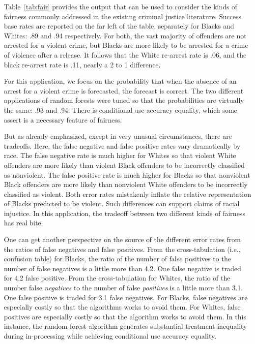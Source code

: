 \documentclass[12pt]{article}
\begin{document}
Table~\ref{tab:fair} provides the output that can be used to consider the kinds of fairness commonly addressed in the existing criminal justice literature. Success base rates are reported on the far left of the table, separately for Blacks and Whites: .89 and .94 respectively. For both, the vast majority of offenders are not arrested for a violent crime, but Blacks are more likely to be arrested for a crime of violence after a release. It follows that the White re-arrest rate is .06, and the black re-arrest rate is .11, nearly a 2 to 1 difference. 

For this application, we focus on the probability that when the absence of an arrest for a violent crime is forecasted, the forecast is correct. The two different applications of random forests were tuned so that the probabilities are virtually the same: .93 and .94. There is conditional use accuracy equality, which some assert is a necessary feature of fairness.

But as already emphasized, except in very unusual circumstances, there are tradeoffs. Here, the false negative and false positive rates vary dramatically by race. The false negative rate is much higher for Whites so that violent White offenders are more likely than violent Black offenders to be incorrectly classified as nonviolent. The false positive rate is much higher for Blacks so that nonviolent Black offenders are more likely than nonviolent White offenders to be incorrectly classified as violent. Both error rates mistakenly inflate the relative representation of Blacks predicted to be violent. Such differences can support claims of racial injustice. In this application, the tradeoff between two different kinds of fairness has real bite.

One can get another perspective on the source of the different error rates from the ratios of false negatives and false positives. From the cross-tabulation (i.e., confusion table) for Blacks, the ratio of the number of false positives to the number of false negatives is a little more than 4.2. One false negative is traded for 4.2 false positive. From the cross-tabulation for Whites, the ratio of the number false \textit{negatives} to the number of false \textit{positives} is a little more than 3.1. One false positive is traded for 3.1 false negatives. For Blacks, false negatives are especially costly so that the algorithms works to avoid them.  For Whites, false positives are especially costly so that the algorithm works to avoid them. In this instance, the random forest algorithm generates substantial treatment inequality during in-processing while achieving conditional use accuracy equality.
\end{document}
